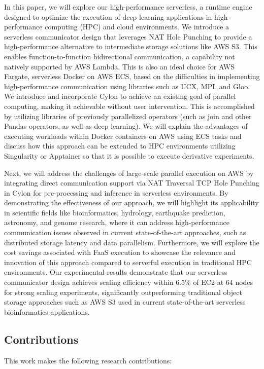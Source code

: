 \documentclass[conference]{IEEEtran}
\begin{document}
In this paper, we will explore our high-performance serverless, a runtime engine designed to optimize the execution of deep learning applications in high-performance computing (HPC) and cloud environments. We introduce a serverless communicator design that leverages NAT Hole Punching to provide a high-performance alternative to intermediate storage solutions like AWS S3.  This enables function-to-function bidirectional communication, a capability not natively supported by AWS Lambda.  This is also an ideal choice for AWS Fargate, serverless Docker on AWS ECS, based on the difficulties in implementing high-performance communication using libraries such as UCX, MPI, and Gloo. We introduce and incorporate Cylon to achieve an existing goal of parallel computing, making it achievable without user intervention. This is accomplished by utilizing libraries of previously parallelized operators (such as join and other Pandas operators, as well as deep learning).  We will explain the advantages of executing workloads within Docker containers on AWS using ECS tasks and discuss how this approach can be extended to HPC environments utilizing Singularity or Apptainer so that it is possible to execute derivative experiments.

Next, we will address the challenges of large-scale parallel execution on AWS by integrating direct communication support via NAT Traversal TCP Hole Punching in Cylon for pre-processing and inference in serverless environments. By demonstrating the effectiveness of our approach, we will highlight its applicability in scientific fields like bioinformatics, hydrology, earthquake prediction, astronomy, and genome research, where it can address high-performance communication issues observed in current state-of-the-art approaches, such as distributed storage latency and data parallelism. Furthermore, we will explore the cost savings associated with FaaS execution to showcase the relevance and innovation of this approach compared to serverful execution in traditional HPC environments.  Our experimental results demonstrate that our serverless communicator design achieves scaling efficiency within 6.5\% of EC2 at 64 nodes for strong scaling experiments, significantly outperforming traditional object storage approaches such as AWS S3 used in current state-of-the-art serverless bioinformatics applications.




\subsection{Contributions}
This work makes the following research contributions:
\newline
\end{document}
